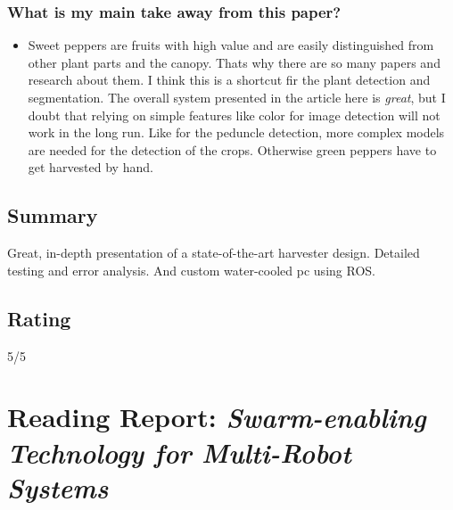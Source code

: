 \documentclass{article}
\begin{document}
\subsubsection*{What is my main take away from this paper?}
\begin{itemize}
    \item Sweet peppers are fruits with high value and are easily distinguished from other plant parts and the canopy. Thats why there are so many papers and research about them. I think this is a shortcut fir the plant detection and segmentation. The overall system presented in the article here is \emph{great}, but I doubt that relying on simple features like color for image detection will not work in the long run. Like for the peduncle detection, more complex models are needed for the detection of the crops. Otherwise green peppers have to get harvested by hand.
\end{itemize}

\subsection*{Summary}
Great, in-depth presentation of a state-of-the-art harvester design. Detailed testing and error analysis. And custom water-cooled pc using ROS.
\subsection*{Rating}
5/5
\section{Reading Report: \emph{Swarm-enabling Technology for Multi-Robot Systems}}
\cite{Chamanbaz2017}
\end{document}
